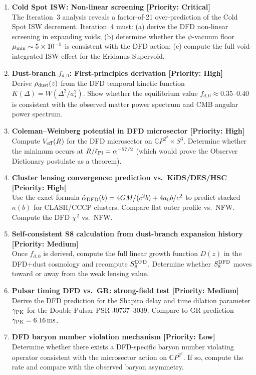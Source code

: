 \documentclass[11pt]{article}
\newcommand{\ee}[1]{\times 10^{#1}}
\newcommand{\CP}{\mathbb{C}P^2}
\newcommand{\alphafine}{\alpha}
\newcommand{\mufd}{\mu}
\newcommand{\astar}{a_\star}
\newcommand{\azero}{a_0}
\newcommand{\DFD}{{\rm DFD}}
\begin{document}
\begin{enumerate}

\item \textbf{Cold Spot ISW: Non-linear screening [Priority: Critical]} \\
The Iteration~3 analysis reveals a factor-of-21 over-prediction of the Cold
Spot ISW decrement.  Iteration~4 must: (a) derive the DFD non-linear
screening in expanding voids; (b) determine whether the $\psi$-vacuum
floor $\mufd_{\rm min} \sim 5\ee{-5}$ is consistent with the DFD action;
(c) compute the full void-integrated ISW effect for the Eridanus Supervoid.

\item \textbf{Dust-branch $f_{d,0}$: First-principles derivation [Priority: High]} \\
Derive $\rho_{\rm dust}(z)$ from the DFD temporal kinetic function
$K(\Delta) = W(\Delta^2/\astar^2)$.  Show whether the equilibrium
value $f_{d,0} \approx 0.35$--$0.40$ is consistent with the observed
matter power spectrum and CMB angular power spectrum.

\item \textbf{Coleman--Weinberg potential in DFD microsector [Priority: High]} \\
Compute $V_{\rm eff}(R)$ for the DFD microsector on $\CP^2\times S^3$.
Determine whether the minimum occurs at $R/\ell_{\rm Pl} = \alphafine^{-57/2}$
(which would prove the Observer Dictionary postulate as a theorem).

\item \textbf{Cluster lensing convergence: prediction vs.\ KiDS/DES/HSC [Priority: High]} \\
Use the exact formula $\hat\alpha_\DFD(b) = 4GM/(c^2 b) + 4\azero b/c^2$
to predict stacked $\kappa(b)$ for CLASH/CCCP clusters.  Compare flat
outer profile vs.\ NFW.  Compute the DFD $\chi^2$ vs.\ NFW.

\item \textbf{Self-consistent S8 calculation from dust-branch expansion history [Priority: Medium]} \\
Once $f_{d,0}$ is derived, compute the full linear growth function
$D(z)$ in the DFD+dust cosmology and recompute $S_8^{\rm DFD}$.
Determine whether $S_8^{\rm DFD}$ moves toward or away from the
weak lensing value.

\item \textbf{Pulsar timing DFD vs.\ GR: strong-field test [Priority: Medium]} \\
Derive the DFD prediction for the Shapiro delay and time dilation
parameter $\gamma_{\rm PK}$ for the Double Pulsar PSR J0737--3039.
Compare to GR prediction $\gamma_{\rm PK} = 6.16\,{\rm ms}$.

\item \textbf{DFD baryon number violation mechanism [Priority: Low]} \\
Determine whether there exists a DFD-specific baryon number violating
operator consistent with the microsector action on $\CP^2$.  If so,
compute the rate and compare with the observed baryon asymmetry.

\end{enumerate}
\end{document}
